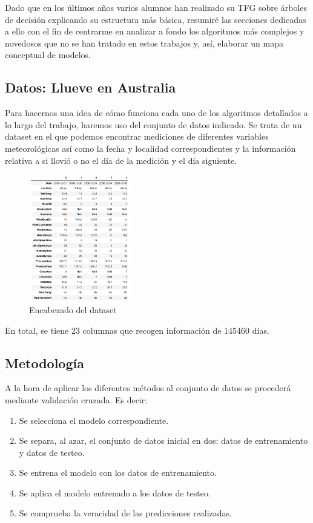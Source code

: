 \documentclass[12pt,twoside]{article}
\begin{document}
Dado que en los últimos años varios alumnos han realizado su TFG sobre árboles de decisión explicando su estructura más básica, resumiré las secciones dedicadas a ello con el fin de centrarme en analizar a fondo los algoritmos más complejos y novedosos que no se han tratado en estos trabajos y, así, elaborar un mapa conceptual de modelos.



\subsection{Datos: Llueve en Australia}

Para hacernos una idea de cómo funciona cada uno de los algoritmos detallados a lo largo del trabajo, haremos uso del conjunto de datos indicado. Se trata de un dataset en el que podemos encontrar mediciones de diferentes variables meteorológicas así como la fecha y localidad correspondientes y la información relativa a si llovió o no el día de la medición y el día siguiente.
\begin{figure}[h]
	\centering
	\includegraphics[width = 0.4\textwidth]{Intro_01}
	\caption{Encabezado del dataset}
\end{figure}

En total, se tiene 23 columnas que recogen información de 145460 días.


\subsection{Metodología}

A la hora de aplicar los diferentes métodos al conjunto de datos se procederá mediante validación cruzada. Es decir:

\begin{enumerate}
\item Se selecciona el modelo correspondiente.
\item Se separa, al azar, el conjunto de datos inicial en dos: datos de entrenamiento y datos de testeo.
\item Se entrena el modelo con los datos de entrenamiento.
\item Se aplica el modelo entrenado a los datos de testeo.
\item Se comprueba la veracidad de las predicciones realizadas.
\end{enumerate}
\end{document}
